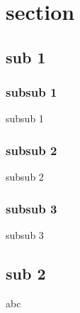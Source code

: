 \documentclass{beamer}
\newcounter{totalsubsub}
\begin{document}
\section{section}
\subsection{sub 1}
\setcounter{totalsubsub}{3}

\subsubsection{subsub 1}
\begin{frame}
    subsub 1
\end{frame} 

\subsubsection{subsub 2}
\begin{frame}
    subsub 2
\end{frame} 

\subsubsection{subsub 3}
\begin{frame}
    subsub 3
\end{frame} 

\subsection{sub 2}
\setcounter{totalsubsub}{0}

\begin{frame}
    abc
\end{frame} 
\end{document}
